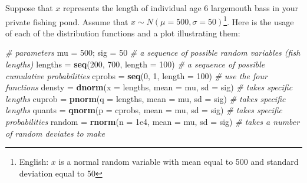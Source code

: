 \documentclass[]{book}
\newenvironment{Shaded}{\begin{snugshade}}{\end{snugshade}}
\newcommand{\CommentTok}[1]{\textcolor[rgb]{0.56,0.35,0.01}{\textit{#1}}}
\newcommand{\DataTypeTok}[1]{\textcolor[rgb]{0.13,0.29,0.53}{#1}}
\newcommand{\DecValTok}[1]{\textcolor[rgb]{0.00,0.00,0.81}{#1}}
\newcommand{\FloatTok}[1]{\textcolor[rgb]{0.00,0.00,0.81}{#1}}
\newcommand{\KeywordTok}[1]{\textcolor[rgb]{0.13,0.29,0.53}{\textbf{#1}}}
\newcommand{\NormalTok}[1]{#1}
\newcommand{\StringTok}[1]{\textcolor[rgb]{0.31,0.60,0.02}{#1}}
\let\rmarkdownfootnote\footnote%
\def\footnote{\protect\rmarkdownfootnote}
\begin{document}
Suppose that \(x\) represents the length of individual age 6 largemouth bass in your private fishing pond. Assume that \(x \sim N(\mu=500, \sigma=50)\)\footnote{English: \(x\) is a normal random variable with mean equal to 500 and standard deviation equal to 50}. Here is the usage of each of the distribution functions and a plot illustrating them:

\begin{Shaded}
\begin{Highlighting}[]
\CommentTok{# parameters}
\NormalTok{mu =}\StringTok{ }\DecValTok{500}\NormalTok{; sig =}\StringTok{ }\DecValTok{50}
\CommentTok{# a sequence of possible random variables (fish lengths)}
\NormalTok{lengths =}\StringTok{ }\KeywordTok{seq}\NormalTok{(}\DecValTok{200}\NormalTok{, }\DecValTok{700}\NormalTok{, }\DataTypeTok{length =} \DecValTok{100}\NormalTok{)}
\CommentTok{# a sequence of possible cumulative probabilities}
\NormalTok{cprobs =}\StringTok{ }\KeywordTok{seq}\NormalTok{(}\DecValTok{0}\NormalTok{, }\DecValTok{1}\NormalTok{, }\DataTypeTok{length =} \DecValTok{100}\NormalTok{)}
\CommentTok{# use the four functions}
\NormalTok{densty =}\StringTok{ }\KeywordTok{dnorm}\NormalTok{(}\DataTypeTok{x =}\NormalTok{ lengths, }\DataTypeTok{mean =}\NormalTok{ mu, }\DataTypeTok{sd =}\NormalTok{ sig)  }\CommentTok{# takes specific lengths}
\NormalTok{cuprob =}\StringTok{ }\KeywordTok{pnorm}\NormalTok{(}\DataTypeTok{q =}\NormalTok{ lengths, }\DataTypeTok{mean =}\NormalTok{ mu, }\DataTypeTok{sd =}\NormalTok{ sig)  }\CommentTok{# takes specific lengths}
\NormalTok{quants =}\StringTok{ }\KeywordTok{qnorm}\NormalTok{(}\DataTypeTok{p =}\NormalTok{ cprobs, }\DataTypeTok{mean =}\NormalTok{ mu, }\DataTypeTok{sd =}\NormalTok{ sig)   }\CommentTok{# takes specific probabilities}
\NormalTok{random =}\StringTok{ }\KeywordTok{rnorm}\NormalTok{(}\DataTypeTok{n =} \FloatTok{1e4}\NormalTok{, }\DataTypeTok{mean =}\NormalTok{ mu, }\DataTypeTok{sd =}\NormalTok{ sig)      }\CommentTok{# takes a number of random deviates to make}


\end{Highlighting}
\end{Shaded}
\end{document}
